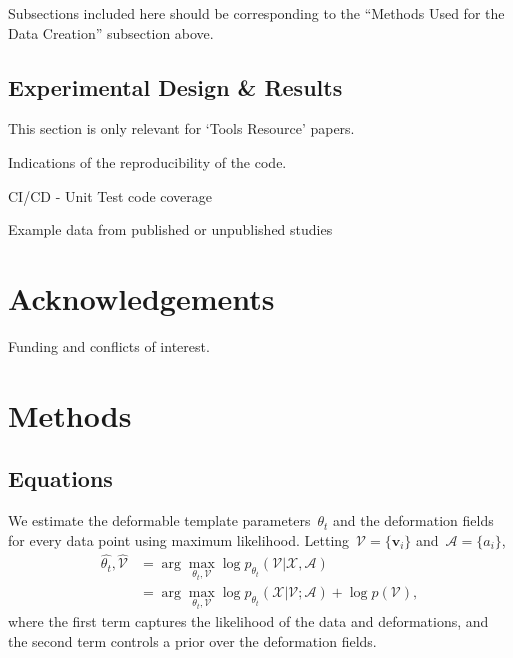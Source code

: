 \documentclass{melba}
\begin{document}
	Subsections included here should be corresponding to the “Methods Used for the Data Creation” subsection above.
    \subsection{Experimental Design \& Results}
	This section is only relevant for ‘Tools Resource’ papers.

	Indications of the reproducibility of the code.

	CI/CD - Unit Test code coverage

	Example data from published or unpublished studies

\section{Acknowledgements}
	Funding and conflicts of interest.





\clearpage
\appendix
\section{Methods}
	\subsection{Equations}
		We estimate the deformable template parameters~$\theta_t$ and the deformation fields for every data point using maximum likelihood. Letting~$\mathcal{V} = \{\boldsymbol{v}_i\}$ and~$\mathcal{A} = \{a_i\}$,
		\begin{align}
			\hat{\theta_t}, \hat{\mathcal{V}} &= \arg \max_{\theta_t, \mathcal{V}} \log p_{\theta_t}(\mathcal{V} | \mathcal{X},  \mathcal{A}) \nonumber \\
			&= \arg \max_{\theta_t, \mathcal{V}} \log p_{\theta_t}(\mathcal{X} | \mathcal{V}; \mathcal{A}) + \log p(\mathcal{V}),
			\label{eq:logpost}
		\end{align}
		where the first term captures the likelihood of the data and deformations, and the second term controls a prior over the deformation fields.
\end{document}
